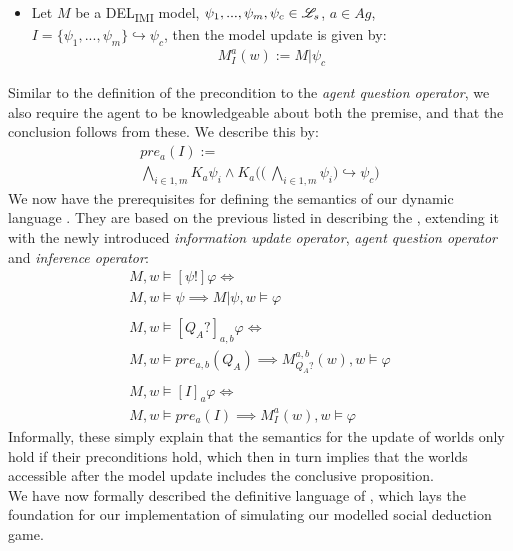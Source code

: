 \begin{itemize}
    \item Let $M$ be a DEL\textsubscript{IMI} model, $\psi_1,...,\psi_m, \psi_c \in
              \mathscr{L}_s$, $a\in Ag$, $I=\{\psi_1,...,\psi_m\} \hookrightarrow \psi_c$, then
          the model update is given by:
          \begin{gather}
              M^a_I(w) := M|\psi_c
          \end{gather}
\end{itemize}
Similar to the definition of the precondition to the \textit{agent question operator}, we also require the agent to be knowledgeable about both the premise, and that the conclusion follows from these. We describe this by:
\begin{gather}
    \nonumber pre_{a}(I) := \\ \bigwedge\limits_{i\in1,m}K_a\psi_i \land K_a\Biggl(\Biggl(\:\bigwedge\limits_{i\in 1,m}\psi_i\Biggr) \hookrightarrow \psi_c \Biggr)
\end{gather}
We now have the prerequisites for defining the semantics of our dynamic language \dynlang. They are based on the previous listed in  describing the \staticlang, extending it with the newly introduced \textit{information update operator}, \textit{agent question operator} and \textit{inference operator}:
\begin{gather}
    M, w \models [\psi!]\varphi \iff \\
    \nonumber M, w \models \psi \implies M|\psi, w \models \varphi \\\nonumber \\
    M, w \models [Q_A?]_{a,b}\varphi \iff \\
    \nonumber M, w \models pre_{a,b}(Q_A) \implies M^{a,b}_{Q_A?}(w), w \models \varphi\\\nonumber\\
    M, w \models [I]_a\varphi \iff \\
    \nonumber M, w \models pre_a(I) \implies M^a_I(w), w \models \varphi
\end{gather}
Informally, these simply explain that the semantics for the update of worlds only hold if their preconditions hold, which then in turn implies that the worlds accessible after the model update includes the conclusive proposition. \\

We have now formally described the definitive language of \dynlang, which lays
the foundation for our implementation of simulating our modelled social
deduction game.